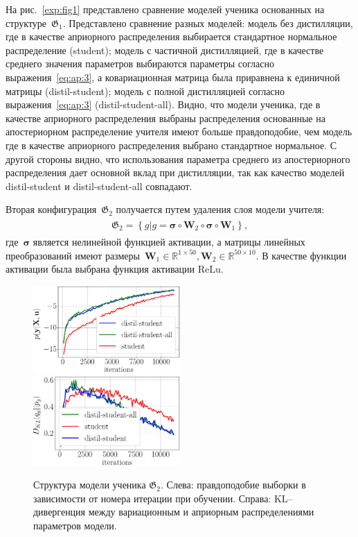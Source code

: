 \documentclass[12pt]{a&t}
\begin{document}
На рис.~\ref{exp:fig1} представлено сравнение моделей ученика основанных на структуре~$\mathfrak{G}_1$. Представлено сравнение разных моделей: модель без дистилляции, где в качестве априорного распределения выбирается стандартное нормальное распределение (student); модель с частичной дистилляцией, где в качестве среднего значения параметров выбираются параметры согласно выражения~\eqref{eq:ap:3}, а ковариационная матрица была приравнена к единичной матрицы (distil-student); модель с полной дистилляцией согласно выражения~\eqref{eq:ap:3} (distil-student-all). Видно, что модели ученика, где в качестве априорного распределения выбраны распределения основанные на апостериорном распределение учителя имеют больше правдоподобие, чем модель где в качестве априорного распределения выбрано стандартное нормальное. С другой стороны видно, что использования параметра среднего из апостериорного распределения дает основной вклад при дистилляции, так как качество моделей distil-student и distil-student-all совпадают.

Вторая конфигурация~$\mathfrak{G}_2$ получается путем удаления слоя модели учителя:
\begin{gather}
\label{eq:ex:3}
\begin{aligned}
\mathfrak{G}_2 = \left\{g| g = \bm{\sigma} \circ \mathbf{W}_2 \circ \bm{\sigma} \circ \mathbf{W}_1\right\},
\end{aligned}
\end{gather}
где~$\bm{\sigma}$ является нелинейной функцией активации, а матрицы линейных преобразований имеют размеры~$\mathbf{W}_{1} \in \mathbb{R}^{1 \times 50}, \mathbf{W}_{2} \in \mathbb{R}^{50 \times 10}$. В качестве функции активации была выбрана функция активации $\text{ReLu}$.

\begin{figure}[h!]
\includegraphics[width=0.5\textwidth]{synthetic_likelihood_2_layers.eps}
\includegraphics[width=0.5\textwidth]{synthetic_D_KL_2_layers.eps}
\caption{Структура модели ученика $\mathfrak{G}_2$. Слева: правдоподобие выборки в зависимости от номера итерации при обучении. Справа: KL--дивергенция между вариационным и априорным распределениями параметров модели.}
\label{exp:fig2}
\end{figure}
\end{document}
